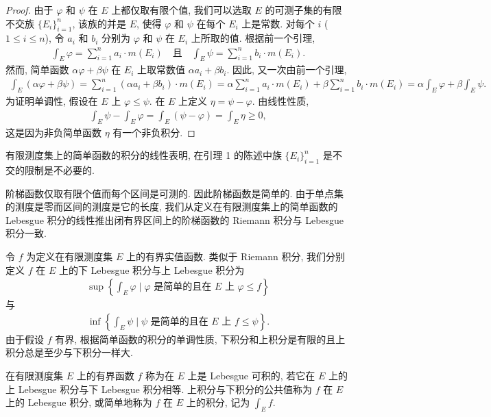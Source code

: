 \documentclass[../../main.tex]{subfiles}
\begin{document}
\begin{proof}
由于 $\varphi$ 和 $\psi$ 在 $E$ 上都仅取有限个值, 我们可以选取 $E$ 的可测子集的有限不交族 $\{E_{i}\}_{i=1}^{n}$, 该族的并是 $E$, 使得 $\varphi$ 和 $\psi$ 在每个 $E_{i}$ 上是常数. 对每个 $i$ ($1\leqslant i\leqslant n$), 令 $a_{i}$ 和 $b_{i}$ 分别为 $\varphi$ 和 $\psi$ 在 $E_{i}$ 上所取的值. 根据前一个引理,
\begin{align*}
\int_{E}\varphi=\sum_{i=1}^{n}a_{i}\cdot m(E_{i})\quad\text{且}\quad\int_{E}\psi=\sum_{i=1}^{n}b_{i}\cdot m(E_{i}).
\end{align*}
然而, 简单函数 $\alpha\varphi+\beta\psi$ 在 $E_{i}$ 上取常数值 $\alpha a_{i}+\beta b_{i}$. 因此, 又一次由前一个引理,
\begin{align*}
\int_{E}(\alpha\varphi+\beta\psi)=\sum_{i=1}^{n}(\alpha a_{i}+\beta b_{i})\cdot m(E_{i})=\alpha\sum_{i=1}^{n}a_{i}\cdot m(E_{i})+\beta\sum_{i=1}^{n}b_{i}\cdot m(E_{i})=\alpha\int_{E}\varphi+\beta\int_{E}\psi.
\end{align*}
为证明单调性, 假设在 $E$ 上 $\varphi\leqslant\psi$. 在 $E$ 上定义 $\eta=\psi-\varphi$. 由线性性质,
\begin{align*}
\int_{E}\psi-\int_{E}\varphi=\int_{E}(\psi-\varphi)=\int_{E}\eta\geqslant 0,
\end{align*}
这是因为非负简单函数 $\eta$ 有一个非负积分.
\end{proof}

有限测度集上的简单函数的积分的线性表明, 在引理 1 的陈述中族 $\{E_{i}\}_{i=1}^{n}$ 是不交的限制是不必要的.

阶梯函数仅取有限个值而每个区间是可测的. 因此阶梯函数是简单的. 由于单点集的测度是零而区间的测度是它的长度, 我们从定义在有限测度集上的简单函数的 Lebesgue 积分的线性推出闭有界区间上的阶梯函数的 Riemann 积分与 Lebesgue 积分一致.

令 $f$ 为定义在有限测度集 $E$ 上的有界实值函数. 类似于 Riemann 积分, 我们分别定义 $f$ 在 $E$ 上的下 Lebesgue 积分与上 Lebesgue 积分为
\begin{align*}
\sup\left\{\int_{E}\varphi\mid\varphi\text{ 是简单的且在 }E\text{ 上 }\varphi\leqslant f\right\}
\end{align*}
与
\begin{align*}
\inf\left\{\int_{E}\psi\mid\psi\text{ 是简单的且在 }E\text{ 上 }f\leqslant\psi\right\}.
\end{align*}
由于假设 $f$ 有界, 根据简单函数的积分的单调性质, 下积分和上积分是有限的且上积分总是至少与下积分一样大.

\begin{definition}[Lebesgue 可积]\label{definition:ch04-Lebesgue可积}
在有限测度集 $E$ 上的有界函数 $f$ 称为在 $E$ 上是 Lebesgue 可积的, 若它在 $E$ 上的上 Lebesgue 积分与下 Lebesgue 积分相等. 上积分与下积分的公共值称为 $f$ 在 $E$ 上的 Lebesgue 积分, 或简单地称为 $f$ 在 $E$ 上的积分, 记为 $\int_{E}f$.
\end{definition}
\end{document}

